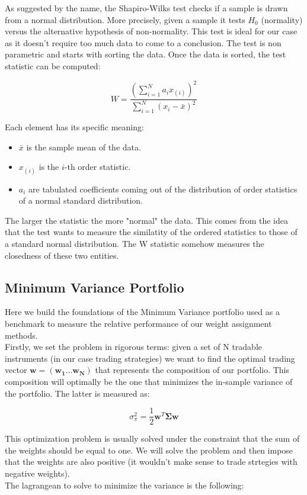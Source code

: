 \documentclass[12pt]{article} %
\numberwithin{equation}{subsection}
\begin{document}
As suggested by the name, the Shapiro-Wilks test checks if a sample is drawn from a normal distribution. More precisely, given a sample it tests $H_0$ (normality) versus the alternative hypothesis of non-normality. This test is ideal for our case as it doesn't require too much data to come to a conclusion. The test is non parametric and starts with sorting the data. Once the data is sorted, the test statistic can be computed:

$$
\displaystyle W = \frac{\left(\sum\limits_{i=1}^N a_{i}x_{(i)}\right)^2}{\sum\limits_{i=1}^N(x_i-\bar{x})^2}
$$

Each element has its specific meaning:
\begin{itemize}
	\item $\bar{x}$ is the sample mean of the data.
	\item $x_{(i)}$ is the $i$-th order statistic. 
	\item $a_i$ are tabulated coefficients coming out of the distribution of order statistics of a normal standard distribution.
\end{itemize}

The larger the statistic the more "normal" the data. This comes from the idea that the test wants to measure the similatity of the ordered statistics to those of a standard normal distribution. The W statistic somehow measures the closedness of these two entities.

\subsection*{Minimum Variance Portfolio}

Here we build the foundations of the Minimum Variance portfolio used as a benchmark to measure the relative performance of our weight assignment methods.\\
Firstly, we set the problem in rigorous terms: given a set of N tradable instruments (in our case trading strategies) we want to find the optimal trading vector $\mathbf{w} = (\mathbf{w_1} \dots \mathbf{w_N})$ that represents the composition of our portfolio. This composition will optimally be the one that minimizes the in-sample variance of the portfolio. The latter is measured as:

$$
\sigma^2_\pi = \frac{1}{2} \mathbf{w}^T\mathbf{\Sigma} \mathbf{w}
$$

This optimization problem is usually solved under the constraint that the sum of the weights should be equal to one. We will solve the problem and then impose that the weights are also positive (it wouldn't make sense to trade strtegies with negative weights).\\
The lagrangean to solve to minimize the variance is the following:
\end{document}
